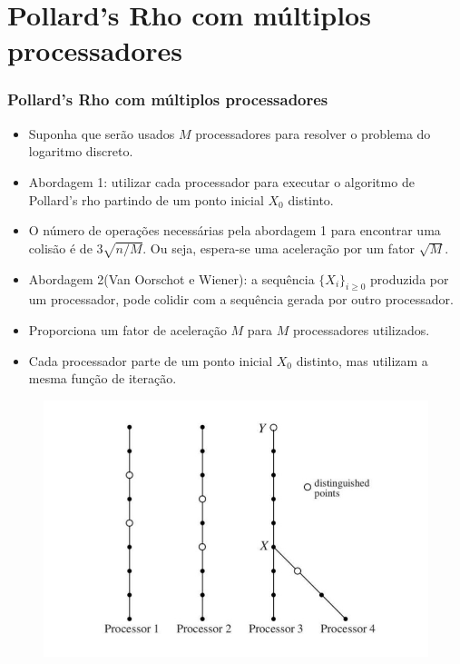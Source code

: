 \documentclass{beamer}
\begin{document}
%
%

\section{Pollard's Rho com múltiplos processadores}
\begin{frame}
\frametitle{Pollard's Rho com múltiplos processadores}
  \begin{itemize}
    \item Suponha que serão usados $M$ processadores para resolver o problema do logaritmo discreto.
    \item Abordagem 1: utilizar cada processador para executar o algoritmo de Pollard's rho partindo de um ponto inicial $X_0$ distinto.
    \item O número de operações necessárias pela abordagem 1 para encontrar uma colisão é de $3\sqrt{n/M}$. Ou seja, espera-se uma aceleração por um fator $\sqrt{M}$.
  \end{itemize}
\end{frame}
\begin{frame}
  \begin{itemize}
    \item Abordagem 2(Van Oorschot e Wiener): a sequência $\{X_i\}_{i \geq 0}$ produzida por um processador, pode colidir com a sequência gerada por outro processador.
    \item Proporciona um fator de aceleração $M$ para $M$ processadores utilizados.
    \item Cada processador parte de um ponto inicial $X_0$ distinto, mas utilizam a mesma função de iteração.
  \end{itemize}
\end{frame}
\begin{frame}
  \begin{figure}
    \includegraphics[scale=0.3]{paralelizado}
  \end{figure}
\end{frame}
\end{document}
